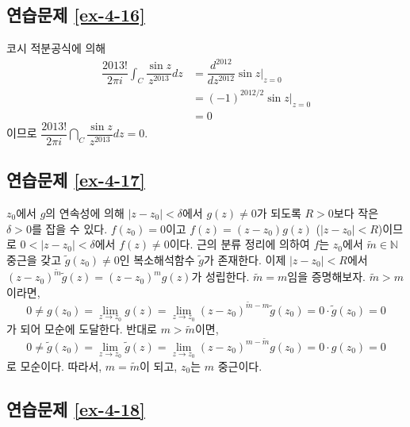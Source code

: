 \subsection*{연습문제 \ref{ex-4-16}}

코시 적분공식에 의해
\begin{align*}
\dfrac{2013!}{2\pi i}  \int_C \dfrac{\sin z}{z^{2013}}dz
&= \dfrac{d^{2012}}{dz^{2012}} \sin z \Big|_{z=0} \\
&= (-1)^{2012/2} \sin z\Big|_{z=0} \\
&=0
\end{align*}
이므로  $\dfrac{2013!}{2\pi i}  \dint_C \dfrac{\sin z}{z^{2013}}dz=0$.

\subsection*{연습문제 \ref{ex-4-17}}

$z_0$에서 $g$의 연속성에 의해
$|z-z_0|<\delta$에서 $g(z)\ne0$가 되도록 $R>0$보다 작은 $\delta>0$를 잡을 수 있다.
$f(z_0)=0$이고 $f(z) = (z-z_0)g(z)$ ($|z-z_0|<R$)이므로
$0<|z-z_0|<\delta$에서  $f(z)\ne0$이다.
근의 분류 정리에 의하여
$f$는 $z_0$에서 $\tilde m\in \mathbb N$ 중근을 갖고
$\tilde g(z_0)\ne0$인 복소해석함수 $\tilde g$가 존재한다.
이제 $|z-z_0|<R$에서
$(z-z_0)^{\tilde m} \tilde g(z) = (z-z_0)^m g(z)$가 성립한다.
$\tilde m = m$임을 증명해보자.
$\tilde m >m$이라면,
\[
0\ne g(z_0) = \lim_{z\to z_0} g(z) = \lim_{z\to z_0} (z-z_0)^{\tilde m - m}\tilde g(z_0) 
= 0\cdot \tilde g(z_0)= 0
\]
가 되어 모순에 도달한다. 반대로 $m>\tilde m$이면,
\[
0\ne \tilde g(z_0) = \lim_{z\to z_0} \tilde g(z) = \lim_{z\to z_0} (z-z_0)^{m - \tilde m} g(z_0) 
= 0\cdot g(z_0)= 0
\]
로 모순이다.
따라서, $m= \tilde m$이 되고, $z_0$는 $m$ 중근이다.

\subsection*{연습문제 \ref{ex-4-18}}

